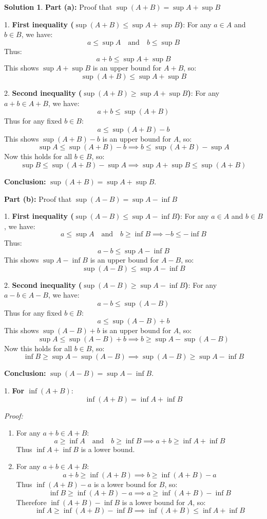 \documentclass{article}
\theoremstyle{definition}
\newtheorem*{solution}{Solution}
\begin{document}
\begin{solution}

\textbf{Part (a):} Proof that \(\sup(A + B) = \sup A + \sup B\)

1. \textbf{First inequality (\(\sup(A + B) \leq \sup A + \sup B\))}:
For any \(a \in A\) and \(b \in B\), we have:
\[
a \leq \sup A \quad \text{and} \quad b \leq \sup B
\]
Thus:
\[
a + b \leq \sup A + \sup B
\]
This shows \(\sup A + \sup B\) is an upper bound for \(A + B\), so:
\[
\sup(A + B) \leq \sup A + \sup B
\]

2. \textbf{Second inequality (\(\sup(A + B) \geq \sup A + \sup B\))}:
For any \(a + b \in A + B\), we have:
\[
a + b \leq \sup(A + B)
\]
Thus for any fixed \(b \in B\):
\[
a \leq \sup(A + B) - b
\]
This shows \(\sup(A + B) - b\) is an upper bound for \(A\), so:
\[
\sup A \leq \sup(A + B) - b \implies b \leq \sup(A + B) - \sup A
\]
Now this holds for all \(b \in B\), so:
\[
\sup B \leq \sup(A + B) - \sup A \implies \sup A + \sup B \leq \sup(A + B)
\]

\textbf{Conclusion:} \(\sup(A + B) = \sup A + \sup B\).

\textbf{Part (b):} Proof that \(\sup(A - B) = \sup A - \inf B\)

1. \textbf{First inequality (\(\sup(A - B) \leq \sup A - \inf B\))}:
For any \(a \in A\) and \(b \in B\), we have:
\[
a \leq \sup A \quad \text{and} \quad b \geq \inf B \implies -b \leq -\inf B
\]
Thus:
\[
a - b \leq \sup A - \inf B
\]
This shows \(\sup A - \inf B\) is an upper bound for \(A - B\), so:
\[
\sup(A - B) \leq \sup A - \inf B
\]

2. \textbf{Second inequality (\(\sup(A - B) \geq \sup A - \inf B\))}:
For any \(a - b \in A - B\), we have:
\[
a - b \leq \sup(A - B)
\]
Thus for any fixed \(b \in B\):
\[
a \leq \sup(A - B) + b
\]
This shows \(\sup(A - B) + b\) is an upper bound for \(A\), so:
\[
\sup A \leq \sup(A - B) + b \implies b \geq \sup A - \sup(A - B)
\]
Now this holds for all \(b \in B\), so:
\[
\inf B \geq \sup A - \sup(A - B) \implies \sup(A - B) \geq \sup A - \inf B
\]

\textbf{Conclusion:} \(\sup(A - B) = \sup A - \inf B\).

\end{solution}



1. \textbf{For \(\inf(A + B)\)}:
\[
\inf(A + B) = \inf A + \inf B
\]

\textit{Proof:}
\begin{enumerate}
    \item For any \(a + b \in A + B\):
    \[
    a \geq \inf A \quad \text{and} \quad b \geq \inf B \implies a + b \geq \inf A + \inf B
    \]
    Thus \(\inf A + \inf B\) is a lower bound.

    \item For any \(a + b \in A + B\):
    \[
    a + b \geq \inf(A + B) \implies b \geq \inf(A + B) - a
    \]
    Thus \(\inf(A + B) - a\) is a lower bound for \(B\), so:
    \[
    \inf B \geq \inf(A + B) - a \implies a \geq \inf(A + B) - \inf B
    \]
    Therefore \(\inf(A + B) - \inf B\) is a lower bound for \(A\), so:
    \[
    \inf A \geq \inf(A + B) - \inf B \implies \inf(A + B) \leq \inf A + \inf B
    \]
\end{enumerate}
\end{document}
